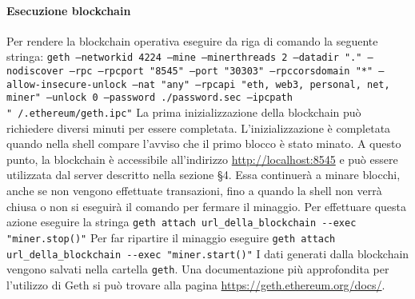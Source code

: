 \paragraph{Esecuzione blockchain}
Per rendere la blockchain operativa eseguire da riga di comando la seguente stringa:\newline
\texttt{geth --networkid 4224 --mine --minerthreads 2 --datadir "." --nodiscover --rpc --rpcport "8545" --port "30303" --rpccorsdomain "*" --allow-insecure-unlock --nat "any" --rpcapi "eth, web3, personal, net, miner" --unlock 0 --password ./password.sec --ipcpath "~/.ethereum/geth.ipc"} \newline
La prima inizializzazione della blockchain può richiedere diversi minuti per essere completata. L'inizializzazione è completata quando nella shell compare l'avviso che il primo blocco è stato minato. A questo punto, la blockchain è accessibile all'indirizzo \url{http://localhost:8545} e può essere utilizzata dal server descritto nella sezione §4. Essa continuerà a minare blocchi, anche se non vengono effettuate transazioni, fino a quando la shell non verrà chiusa o non si eseguirà il comando per fermare il minaggio. Per effettuare questa azione eseguire la stringa \newline
\texttt{geth attach url\_della\_blockchain -{}-exec "miner.stop()"} \newline
Per far ripartire il minaggio eseguire \newline
\texttt{geth attach url\_della\_blockchain -{}-exec "miner.start()"} \newline
I dati generati dalla blockchain vengono salvati nella cartella \texttt{geth}. \newline
Una documentazione più approfondita per l'utilizzo di Geth si può trovare alla pagina \url{https://geth.ethereum.org/docs/}.


